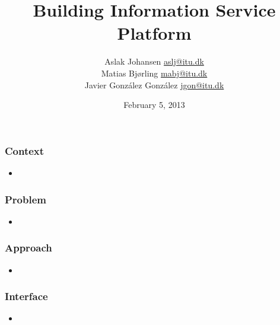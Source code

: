 \documentclass[t]{beamer}
\title{Building Information Service Platform\\\scalebox{0.85}{a Discrete Event Simulator for Building Modeling}}
\author{Aslak Johansen \url{aslj@itu.dk}\\Matias Bjørling \url{mabj@itu.dk}\\Javier González González \url{jgon@itu.dk}}
\date{February 5, 2013}
\begin{document}
\frame{\titlepage}

\begin{frame}
  \frametitle{Context}
  
  \begin{itemize}
    \item 
  \end{itemize}
  
\end{frame}

\begin{frame}
  \frametitle{Problem}
  
  \begin{itemize}
    \item 
  \end{itemize}
  
\end{frame}

\begin{frame}
  \frametitle{Approach}
  
  \begin{itemize}
    \item 
  \end{itemize}
  
\end{frame}

\begin{frame}
  \frametitle{Interface}
  
  \begin{itemize}
    \item 
  \end{itemize}
  
\end{frame}
\end{document}
